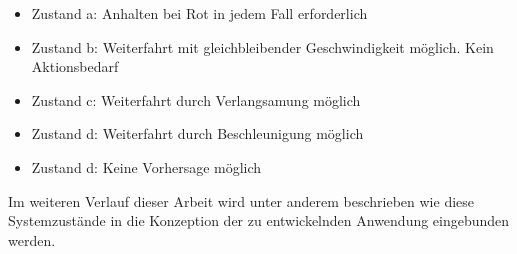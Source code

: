 \begin{itemize}
	\item Zustand a: Anhalten bei Rot in jedem Fall erforderlich
	\item Zustand b: Weiterfahrt mit gleichbleibender Geschwindigkeit möglich. Kein Aktionsbedarf
	\item Zustand c: Weiterfahrt durch Verlangsamung möglich
	\item Zustand d: Weiterfahrt durch Beschleunigung möglich
	\item Zustand d: Keine Vorhersage möglich
\end{itemize}
Im weiteren Verlauf dieser Arbeit wird unter anderem beschrieben wie diese Systemzustände in die Konzeption der zu entwickelnden Anwendung eingebunden werden.
